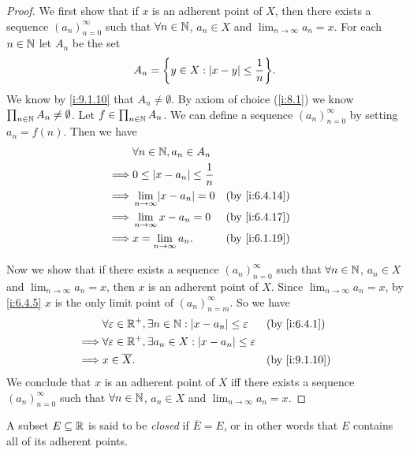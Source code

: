 \begin{proof}
  We first show that if \(x\) is an adherent point of \(X\), then there exists a sequence \((a_n)_{n = 0}^\infty\) such that \(\forall n \in \mathbb{N}\), \(a_n \in X\) and \(\lim_{n \to \infty} a_n = x\).
  For each \(n \in \mathbb{N}\) let \(A_n\) be the set
  \[
    A_n = \set{y \in X : \abs{x - y} \leq \dfrac{1}{n}}.
  \]
  We know by \cref{i:9.1.10} that \(A_n \neq \emptyset\).
  By axiom of choice (\cref{i:8.1}) we know \(\prod_{n \in \mathbb{N}} A_n \neq \emptyset\).
  Let \(f \in \prod_{n \in \mathbb{N}} A_n\).
  We can define a sequence \((a_n)_{n = 0}^\infty\) by setting \(a_n = f(n)\).
  Then we have
  \begin{align*}
             & \forall n \in \N, a_n \in A_n                             \\
    \implies & 0 \leq \abs{x - a_n} \leq \dfrac{1}{n}                    \\
    \implies & \lim_{n \to \infty} \abs{x - a_n} = 0  &  & \by{i:6.4.14} \\
    \implies & \lim_{n \to \infty} x - a_n = 0        &  & \by{i:6.4.17} \\
    \implies & x = \lim_{n \to \infty} a_n.           &  & \by{i:6.1.19}
  \end{align*}

  Now we show that if there exists a sequence \((a_n)_{n = 0}^\infty\) such that \(\forall n \in \mathbb{N}\), \(a_n \in X\) and \(\lim_{n \to \infty} a_n = x\), then \(x\) is an adherent point of \(X\).
  Since \(\lim_{n \to \infty} a_n = x\), by \cref{i:6.4.5} \(x\) is the only limit point of \((a_n)_{n = m}^\infty\).
  So we have
  \begin{align*}
             & \forall \varepsilon \in \R^+, \exists n \in \N : \abs{x - a_n} \leq \varepsilon  &  & \by{i:6.4.1}  \\
    \implies & \forall \varepsilon \in \R^+, \exists a_n \in X : \abs{x - a_n} \leq \varepsilon                    \\
    \implies & x \in \overline{X}.                                                              &  & \by{i:9.1.10}
  \end{align*}
  We conclude that \(x\) is an adherent point of \(X\) iff there exists a sequence \((a_n)_{n = 0}^\infty\) such that \(\forall n \in \mathbb{N}\), \(a_n \in X\) and \(\lim_{n \to \infty} a_n = x\).
\end{proof}

\begin{defn}\label{i:9.1.15}
  A subset \(E \subseteq \mathbb{R}\) is said to be \emph{closed} if \(\overline{E} = E\), or in other words that \(E\) contains all of its adherent points.
\end{defn}


